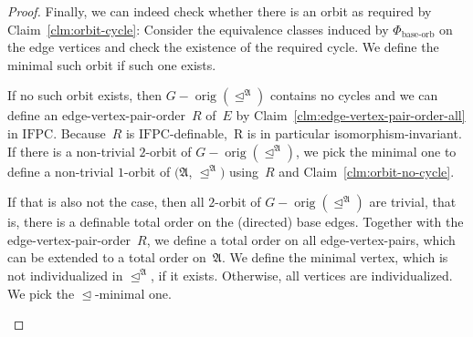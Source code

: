 \documentclass[]{lmcs}
\newcommand{\formA}{\Phi}
\newcommand{\Struct}{\mathfrak{A}}
\newcommand{\StructA}{\mathfrak{A}}
\newcommand{\IFPC}{\ensuremath{\mathrm{IFPC}}}
\newcommand{\orig}[1]{\operatorname{orig}(#1)}
\newcommand{\indRel}{\trianglelefteq}
\begin{document}
\begin{proof}
	Finally, we can indeed check whether there is an orbit as required
	by Claim~\ref{clm:orbit-cycle}:
	Consider the equivalence classes induced by $\formA_{\text{base-orb}}$
	on the edge vertices and check the existence of the required cycle.
	We define the minimal such orbit if such one exists.
	
	If no such orbit exists,
	then $G-\orig{\indRel^\Struct}$ contains no cycles
	and we can define an edge-vertex-pair-order~$R$ of~$E$ by Claim~\ref{clm:edge-vertex-pair-order-all} in \IFPC{}.
	Because~$R$ is \IFPC{}-definable,~R is in particular isomorphism-invariant.
	If there is a non-trivial $2$-orbit of $G-\orig{\indRel^\Struct}$,
	we pick the minimal one to define a non-trivial $1$-orbit of $(\Struct$, $\indRel^\Struct)$ using~$R$ and Claim~\ref{clm:orbit-no-cycle}.
	
	If that is also not the case, then all $2$-orbit of $G-\orig{\indRel^\Struct}$ are trivial,
	that is, there is a definable total order on the (directed) base edges.
	Together with the edge-vertex-pair-order~$R$,
	we define a total order on all edge-vertex-pairs,
	which can be extended to a total order on~$\StructA$.
	We define the minimal vertex, which is not individualized
	in $\indRel^\Struct$, if it exists.
	Otherwise, all vertices are individualized.
	We pick the $\indRel$-minimal one.
	
	
	\begin{figure}
		\centering
\end{figure}
\end{proof}
\end{document}
